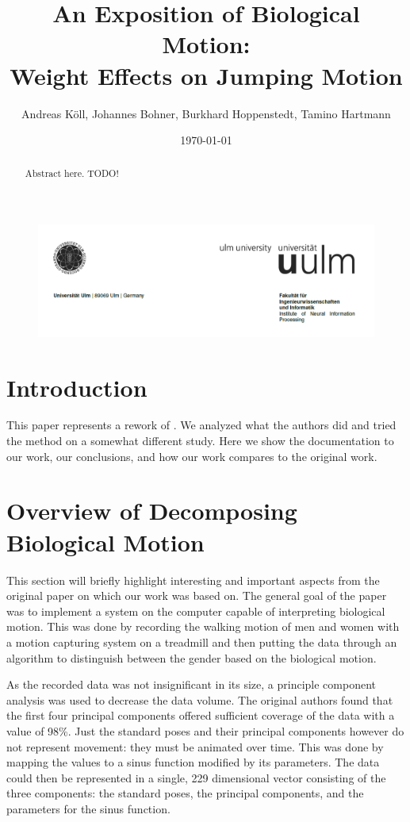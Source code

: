 \documentclass[a4paper]{article}
\begin{document}
\begin{figure}
	\includegraphics[width=15.5cm]{header.png}
\end{figure}
\title{An Exposition of Biological Motion:\\ Weight Effects on Jumping Motion}
\author{Andreas Köll, Johannes Bohner, Burkhard Hoppenstedt, Tamino Hartmann}
\date{\today}

\maketitle

\begin{abstract}
Abstract here. TODO!
\end{abstract}
\newpage

\section{Introduction}

This paper represents a rework of \cite{origin}.
We analyzed what the authors did and tried the method on a somewhat different study.
Here we show the documentation to our work, our conclusions, and how our work compares to the original work.

\section{Overview of Decomposing Biological Motion}

This section will briefly highlight interesting and important aspects from the original paper on which our work was based on.
The general goal of the paper was to implement a system on the computer capable of interpreting biological motion.
This was done by recording the walking motion of men and women with a motion capturing system on a treadmill and then putting the data through an algorithm to distinguish between the gender based on the biological motion.

As the recorded data was not insignificant in its size, a principle component analysis was used to decrease the data volume.
The original authors found that the first four principal components offered sufficient coverage of the data with a value of 98\%.
Just the standard poses and their principal components however do not represent movement: they must be animated over time.
This was done by mapping the values to a sinus function modified by its parameters.
The data could then be represented in a single, 229 dimensional vector consisting of the three components: the standard poses, the principal components, and the parameters for the sinus function.
\end{document}
